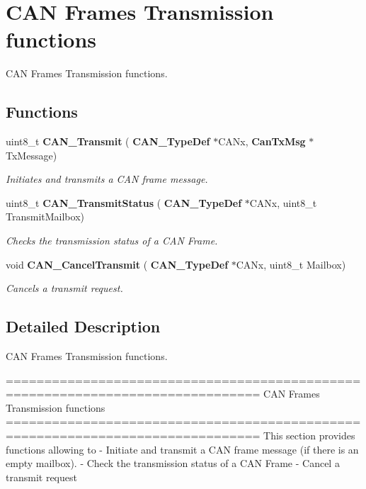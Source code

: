 \section{C\+AN Frames Transmission functions}
\label{group__CAN__Group2}


C\+AN Frames Transmission functions.  


\subsection*{Functions}
\begin{DoxyCompactItemize}
\item 
uint8\+\_\+t \textbf{ C\+A\+N\+\_\+\+Transmit} (\textbf{ C\+A\+N\+\_\+\+Type\+Def} $\ast$C\+A\+Nx, \textbf{ Can\+Tx\+Msg} $\ast$Tx\+Message)
\begin{DoxyCompactList}\small\item\em Initiates and transmits a C\+AN frame message. \end{DoxyCompactList}\item 
uint8\+\_\+t \textbf{ C\+A\+N\+\_\+\+Transmit\+Status} (\textbf{ C\+A\+N\+\_\+\+Type\+Def} $\ast$C\+A\+Nx, uint8\+\_\+t Transmit\+Mailbox)
\begin{DoxyCompactList}\small\item\em Checks the transmission status of a C\+AN Frame. \end{DoxyCompactList}\item 
void \textbf{ C\+A\+N\+\_\+\+Cancel\+Transmit} (\textbf{ C\+A\+N\+\_\+\+Type\+Def} $\ast$C\+A\+Nx, uint8\+\_\+t Mailbox)
\begin{DoxyCompactList}\small\item\em Cancels a transmit request. \end{DoxyCompactList}\end{DoxyCompactItemize}


\subsection{Detailed Description}
C\+AN Frames Transmission functions. 

\begin{DoxyVerb} ===============================================================================
                      CAN Frames Transmission functions
 ===============================================================================  
  This section provides functions allowing to 
   - Initiate and transmit a CAN frame message (if there is an empty mailbox).
   - Check the transmission status of a CAN Frame
   - Cancel a transmit request\end{DoxyVerb}
 

